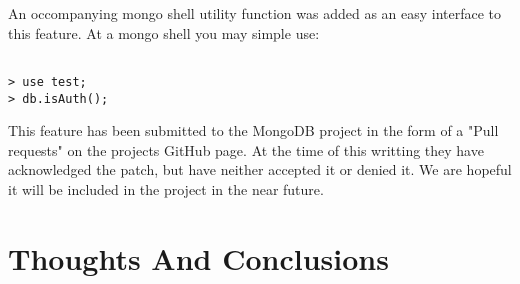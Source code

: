 \documentclass{../dependencies/acm_proc_article-sp}
\begin{document}
An occompanying mongo shell utility function was added as an easy
interface to this feature. At a mongo shell you may simple use:
\begin{lstlisting}

> use test;
> db.isAuth();
\end{lstlisting}

This feature has been submitted to the MongoDB project in the form
of a "Pull requests" on the projects GitHub page. \cite{4}
At the time of this writting they have acknowledged the patch, but have
neither accepted it or denied it. We are hopeful it will be included
in the project in the near future.

\newpage
%

%
%
\balancecolumns

\section{Thoughts And Conclusions }
\end{document}
